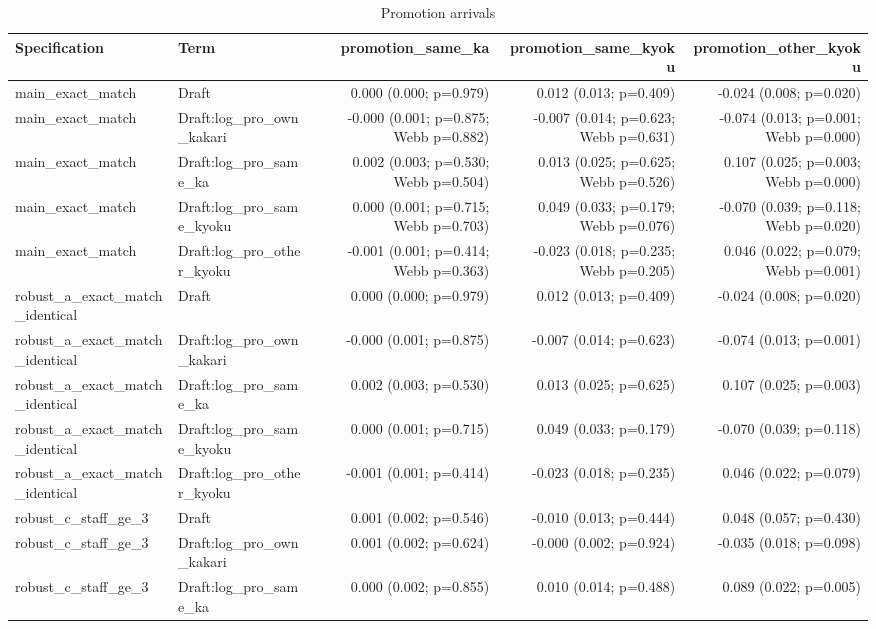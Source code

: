 \begin{table}[!htbp]
\centering
\caption{Promotion arrivals}
\begin{tabular}{llrrr}
\hline
Specification & Term & promotion_same_ka & promotion_same_kyoku & promotion_other_kyoku
\\
\hline
main_exact_match & Draft & 0.000 (0.000; p=0.979) & 0.012 (0.013; p=0.409) & -0.024 (0.008; p=0.020)
\\
main_exact_match & Draft:log_pro_own_kakari & -0.000 (0.001; p=0.875; Webb p=0.882) & -0.007 (0.014; p=0.623; Webb p=0.631) & -0.074 (0.013; p=0.001; Webb p=0.000)
\\
main_exact_match & Draft:log_pro_same_ka & 0.002 (0.003; p=0.530; Webb p=0.504) & 0.013 (0.025; p=0.625; Webb p=0.526) & 0.107 (0.025; p=0.003; Webb p=0.000)
\\
main_exact_match & Draft:log_pro_same_kyoku & 0.000 (0.001; p=0.715; Webb p=0.703) & 0.049 (0.033; p=0.179; Webb p=0.076) & -0.070 (0.039; p=0.118; Webb p=0.020)
\\
main_exact_match & Draft:log_pro_other_kyoku & -0.001 (0.001; p=0.414; Webb p=0.363) & -0.023 (0.018; p=0.235; Webb p=0.205) & 0.046 (0.022; p=0.079; Webb p=0.001)
\\
robust_a_exact_match_identical & Draft & 0.000 (0.000; p=0.979) & 0.012 (0.013; p=0.409) & -0.024 (0.008; p=0.020)
\\
robust_a_exact_match_identical & Draft:log_pro_own_kakari & -0.000 (0.001; p=0.875) & -0.007 (0.014; p=0.623) & -0.074 (0.013; p=0.001)
\\
robust_a_exact_match_identical & Draft:log_pro_same_ka & 0.002 (0.003; p=0.530) & 0.013 (0.025; p=0.625) & 0.107 (0.025; p=0.003)
\\
robust_a_exact_match_identical & Draft:log_pro_same_kyoku & 0.000 (0.001; p=0.715) & 0.049 (0.033; p=0.179) & -0.070 (0.039; p=0.118)
\\
robust_a_exact_match_identical & Draft:log_pro_other_kyoku & -0.001 (0.001; p=0.414) & -0.023 (0.018; p=0.235) & 0.046 (0.022; p=0.079)
\\
robust_c_staff_ge_3 & Draft & 0.001 (0.002; p=0.546) & -0.010 (0.013; p=0.444) & 0.048 (0.057; p=0.430)
\\
robust_c_staff_ge_3 & Draft:log_pro_own_kakari & 0.001 (0.002; p=0.624) & -0.000 (0.002; p=0.924) & -0.035 (0.018; p=0.098)
\\
robust_c_staff_ge_3 & Draft:log_pro_same_ka & 0.000 (0.002; p=0.855) & 0.010 (0.014; p=0.488) & 0.089 (0.022; p=0.005)
\\

\end{tabular}
\end{table}
